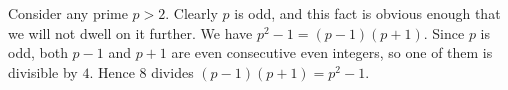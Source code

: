 Consider any prime $p > 2$. Clearly $p$ is odd, and this fact is obvious enough
that we will not dwell on it further. We have $p^2 - 1 = (p-1)(p+1)$.
Since $p$ is odd, both $p - 1$ and $p + 1$ are even consecutive even integers,
so one of them is divisible by $4$. Hence $8$ divides $(p-1)(p+1) = p^2 - 1$.
